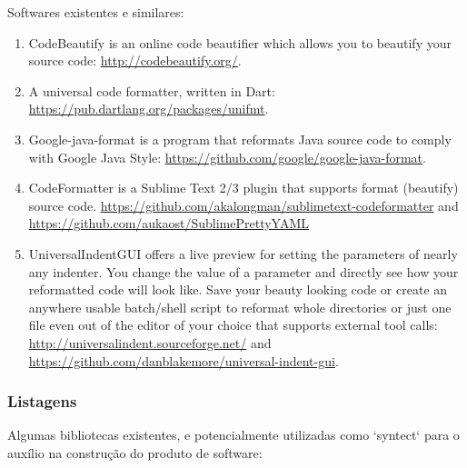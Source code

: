 \begin{englishtext}
    Softwares existentes e similares:

    \medskip
    \begin{bluebox}
    \begin{enumerate}[leftmargin=*]

        \item

        CodeBeautify is an online code beautifier which allows you to beautify your source code:
        \url{http://codebeautify.org/}.

        \item

        A universal code formatter, written in Dart: \url{https://pub.dartlang.org/packages/unifmt}.

        \item

        Google-java-format is a program that reformats Java source code to comply with Google Java
        Style: \url{https://github.com/google/google-java-format}.

        \item

        CodeFormatter is a Sublime Text 2/3 plugin that supports format (beautify) source code.
        \url{https://github.com/akalongman/sublimetext-codeformatter} and
        \url{https://github.com/aukaost/SublimePrettyYAML}

        \item

        UniversalIndentGUI offers a live preview for setting the parameters of nearly any indenter.
        You change the value of a parameter and directly see how your reformatted code will look
        like. Save your beauty looking code or create an anywhere usable batch/shell script to
        reformat whole directories or just one file even out of the editor of your choice that
        supports external tool calls: \url{http://universalindent.sourceforge.net/} and
        \url{https://github.com/danblakemore/universal-indent-gui}.

    \end{enumerate}
    \end{bluebox}


\subsubsection{Listagens}

    Algumas bibliotecas existentes, e potencialmente utilizadas como `syntect` para o auxílio na
    construção do produto de software:


\end{englishtext}
